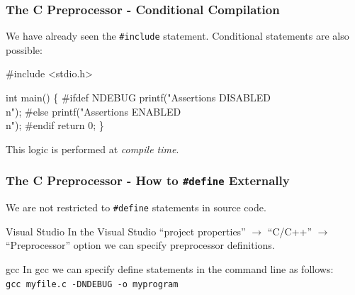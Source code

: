\documentclass[table]{beamer}
\newif\ifschigh\schighfalse
\newcommand{\kw}[1]{\ifschigh\textcolor{red}{#1}\else\textcolor{keyword}{#1}\fi}
\newcommand{\kt}[1]{\ifschigh\textcolor{red}{#1}\else\textcolor{ctext}{#1}\fi}
\newcounter{sckll}
\newcommand{\kr}{\setcounter{sckll}{1}}
\newcommand{\kl}{}
\begin{document}
\begin{frame}[fragile]
\frametitle{The C Preprocessor - Conditional Compilation}
We have already seen the {\tt \kw{\#include}} statement. Conditional statements are also possible:
\vspace{-0.2in}
\begin{semiverbatim}
\small
\kr\kl\kw{\#include} \kt{<stdio.h>}
\kl
\kl\kw{int} main()
\kl\{
\kl\kw{\#ifdef} NDEBUG
\kl   printf(\kt{"Assertions DISABLED\\n"});
\kl\kw{\#else}
\kl   printf(\kt{"Assertions ENABLED\\n"});
\kl\kw{\#endif}
\kl   \kw{return} 0;
\kl\}
\end{semiverbatim}
\begin{alertblock}{}
This logic is performed at \emph{compile time}.
\end{alertblock}
\end{frame}

\begin{frame}
\frametitle{The C Preprocessor - How to {\tt\#define} Externally}
We are not restricted to {\tt \kw{\#define}} statements in source code.
\begin{block}{Visual Studio}
In the Visual Studio ``project properties'' $\rightarrow$ ``C/C++'' $\rightarrow$ ``Preprocessor'' option we can specify preprocessor definitions.
\end{block}

\begin{block}{gcc}
In gcc we can specify define statements in the command line as follows:\\
{\tt gcc myfile.c -DNDEBUG -o myprogram }
\end{block}
\end{frame}
\end{document}
